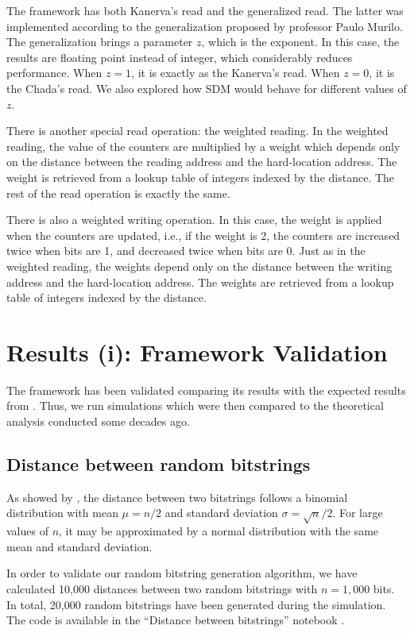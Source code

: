 The framework has both Kanerva's read and the generalized read. The latter was implemented according to the generalization proposed by professor Paulo Murilo. The generalization brings a parameter $z$, which is the exponent. In this case, the results are floating point instead of integer, which considerably reduces performance. When $z=1$, it is exactly as the Kanerva's read. When $z=0$, it is the Chada's read. We also explored how SDM would behave for different values of $z$.

There is another special read operation: the weighted reading. In the weighted reading, the value of the counters are multiplied by a weight which depends only on the distance between the reading address and the hard-location address. The weight is retrieved from a lookup table of integers indexed by the distance. The rest of the read operation is exactly the same.

There is also a weighted writing operation. In this case, the weight is applied when the counters are updated, i.e., if the weight is 2, the counters are increased twice when bits are 1, and decreased twice when bits are 0. Just as in the weighted reading, the weights depend only on the distance between the writing address and the hard-location address. The weights are retrieved from a lookup table of integers indexed by the distance.


\chapter{Results (i): Framework Validation}

The framework has been validated comparing its results with the expected results from \citet{Kanerva1988}. Thus, we run simulations which were then compared to the theoretical analysis conducted some decades ago.

\section{Distance between random bitstrings}

As showed by \citet{Kanerva1988}, the distance between two bitstrings follows a binomial distribution with mean $\mu = n/2$ and standard deviation $\sigma = \sqrt{n}/2$. For large values of $n$, it may be approximated by a normal distribution with the same mean and standard deviation.

In order to validate our random bitstring generation algorithm, we have calculated 10,000 distances between two random bitstrings with $n=1,000$ bits. In total, 20,000 random bitstrings have been generated during the simulation. The code is available in the ``Distance between bitstrings'' notebook \citep{sdmframework}.

